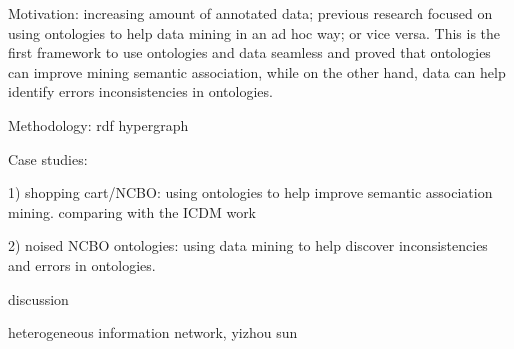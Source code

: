 Motivation: increasing amount of annotated data; previous research focused on using ontologies to help data mining in an ad hoc way; or vice versa. This is the first framework to use ontologies and data seamless and proved that ontologies can improve mining semantic association, while on the other hand, data can help identify errors inconsistencies in ontologies.

Methodology: rdf hypergraph 

Case studies:

1) shopping cart/NCBO: using ontologies to help improve semantic association mining. comparing with the ICDM work

2) noised NCBO ontologies: using data mining to help discover inconsistencies and errors in ontologies.

discussion

heterogeneous information network, yizhou sun